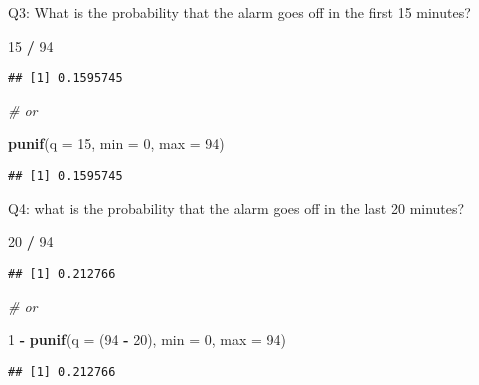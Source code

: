 \documentclass[]{article}
\newenvironment{Shaded}{\begin{snugshade}}{\end{snugshade}}
\newcommand{\CommentTok}[1]{\textcolor[rgb]{0.56,0.35,0.01}{\textit{#1}}}
\newcommand{\DataTypeTok}[1]{\textcolor[rgb]{0.13,0.29,0.53}{#1}}
\newcommand{\DecValTok}[1]{\textcolor[rgb]{0.00,0.00,0.81}{#1}}
\newcommand{\KeywordTok}[1]{\textcolor[rgb]{0.13,0.29,0.53}{\textbf{#1}}}
\newcommand{\NormalTok}[1]{#1}
\newcommand{\OperatorTok}[1]{\textcolor[rgb]{0.81,0.36,0.00}{\textbf{#1}}}
\newcommand{\StringTok}[1]{\textcolor[rgb]{0.31,0.60,0.02}{#1}}
\begin{document}
Q3: What is the probability that the alarm goes off in the first 15
minutes?

\begin{Shaded}
\begin{Highlighting}[]
\DecValTok{15} \OperatorTok{/}\StringTok{ }\DecValTok{94}
\end{Highlighting}
\end{Shaded}

\begin{verbatim}
## [1] 0.1595745
\end{verbatim}

\begin{Shaded}
\begin{Highlighting}[]
\CommentTok{# or}

\KeywordTok{punif}\NormalTok{(}\DataTypeTok{q =} \DecValTok{15}\NormalTok{, }\DataTypeTok{min =} \DecValTok{0}\NormalTok{, }\DataTypeTok{max =} \DecValTok{94}\NormalTok{)}
\end{Highlighting}
\end{Shaded}

\begin{verbatim}
## [1] 0.1595745
\end{verbatim}

Q4: what is the probability that the alarm goes off in the last 20
minutes?

\begin{Shaded}
\begin{Highlighting}[]
\DecValTok{20} \OperatorTok{/}\StringTok{ }\DecValTok{94}
\end{Highlighting}
\end{Shaded}

\begin{verbatim}
## [1] 0.212766
\end{verbatim}

\begin{Shaded}
\begin{Highlighting}[]
\CommentTok{# or}

\DecValTok{1} \OperatorTok{-}\StringTok{ }\KeywordTok{punif}\NormalTok{(}\DataTypeTok{q =}\NormalTok{ (}\DecValTok{94} \OperatorTok{-}\StringTok{ }\DecValTok{20}\NormalTok{), }\DataTypeTok{min =} \DecValTok{0}\NormalTok{, }\DataTypeTok{max =} \DecValTok{94}\NormalTok{)}
\end{Highlighting}
\end{Shaded}

\begin{verbatim}
## [1] 0.212766
\end{verbatim}
\end{document}

